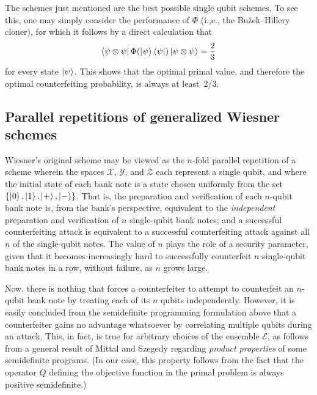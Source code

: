 \documentclass[11pt,letterpaper]{article}
\theoremstyle{definition}
\newcommand{\microspace}{\mspace{0.5mu}}
\def \lket {\left|}
\def \rket {\right\rangle}
\def \lbra {\left\langle}
\def \rbra {\right|}
\newcommand{\ket}[1]{\lket\microspace #1 \microspace\rket}
\newcommand{\bra}[1]{\lbra\microspace #1 \microspace\rbra}
\def\X{\mathcal{X}}
\def\Y{\mathcal{Y}}
\def\Z{\mathcal{Z}}
\def\E{\mathcal{E}}
\begin{document}
The schemes just mentioned are the best possible single qubit schemes.
To see this, one may simply consider the performance of 
$\Phi$ (i.,e., the Bu\v{z}ek--Hillery cloner), for which it
follows by a direct calculation that
\[
\bra{\psi\otimes\psi} \Phi(\ket{\psi}\bra{\psi}) \ket{\psi\otimes\psi}
= \frac{2}{3}
\]
for every state $\ket{\psi}$.
This shows that the optimal primal value, and therefore the optimal
counterfeiting probability, is always at least~2/3.

\subsection{Parallel repetitions of generalized Wiesner
  schemes \label{sec:par-rep}}

Wiesner's original scheme may be viewed as the $n$-fold parallel
repetition of a scheme wherein the spaces $\X$, $\Y$, and $\Z$
each represent a single qubit, and where the initial state of each
bank note is a state chosen uniformly from the set
$\{\ket{0},\ket{1},\ket{+},\ket{-}\}$.
That is, the preparation and verification of each $n$-qubit bank note
is, from the bank's perspective, equivalent to the \emph{independent}
preparation and verification of $n$ single-qubit bank notes; and a
successful counterfeiting attack is equivalent to a successful
counterfeiting attack against all $n$ of the single-qubit notes.
The value of $n$ plays the role of a security parameter, given that it becomes
increasingly hard to successfully counterfeit $n$ single-qubit bank
notes in a row, without failure, as $n$ grows large.

Now, there is nothing that forces a counterfeiter to attempt to
counterfeit an $n$-qubit bank note by treating each of its $n$ qubits
independently.
However, it is easily concluded from the semidefinite programming
formulation above that a counterfeiter gains no advantage whatsoever
by correlating multiple qubits during an attack.
This, in fact, is true for arbitrary choices of the ensemble $\E$, as
follows from a general result of Mittal and Szegedy
\cite{MittalS07} regarding \emph{product properties} of some
semidefinite programs.
(In our case, this property follows from the fact that the operator
$Q$ defining the objective function in the primal problem is always
positive semidefinite.)
\end{document}
